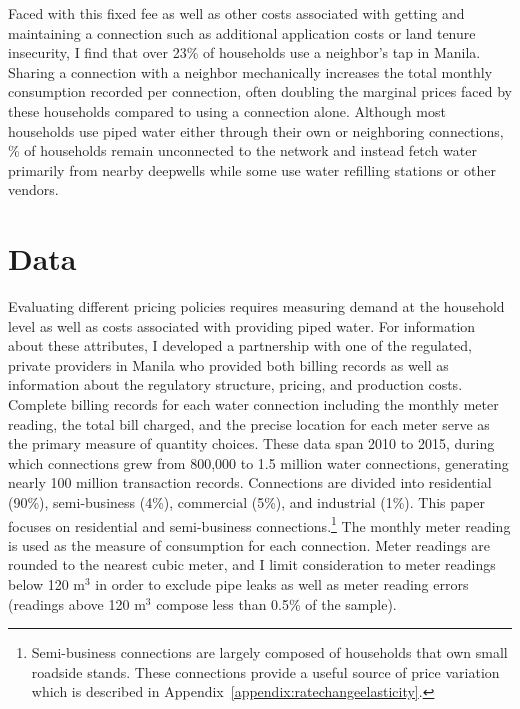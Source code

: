 \documentclass[12pt]{article}
\begin{document}
Faced with this fixed fee as well as other costs associated with getting and maintaining a connection such as additional application costs or land tenure insecurity, I find that over 23\unskip\% of households use a neighbor's tap in Manila.  Sharing a connection with a neighbor mechanically increases the total monthly consumption recorded per connection, often doubling the marginal prices faced by these households compared to using a connection alone.  Although most households use piped water either through their own or neighboring connections, \unskip\% of households remain unconnected to the network and instead fetch water primarily from nearby deepwells while some use water refilling stations or other vendors.



\section{Data}\label{section:data}

Evaluating different pricing policies requires measuring demand at the household level as well as costs associated with providing piped water.  For information about these attributes, I developed a partnership with one of the regulated, private providers in Manila who provided both billing records as well as information about the regulatory structure, pricing, and production costs.  Complete billing records for each water connection including the monthly meter reading, the total bill charged, and the precise location for each meter serve as the primary measure of quantity choices.  These data span 2010 to 2015, during which connections grew from 800,000 to 1.5 million water connections, generating nearly 100 million transaction records.  Connections are divided into residential (90\%), semi-business (4\%), commercial (5\%), and industrial (1\%).  This paper focuses on residential and semi-business connections.\footnote{Semi-business connections are largely composed of households that own small roadside stands.  These connections provide a useful source of price variation which is described in Appendix~\ref{appendix:ratechangeelasticity}.}  The monthly meter reading is used as the measure of consumption for each connection.  Meter readings are rounded to the nearest cubic meter, and I limit consideration to meter readings below 120 $\text{m}^{3}$ in order to exclude pipe leaks as well as meter reading errors (readings above 120 $\text{m}^{3}$ compose less than 0.5\% of the sample).
\end{document}
